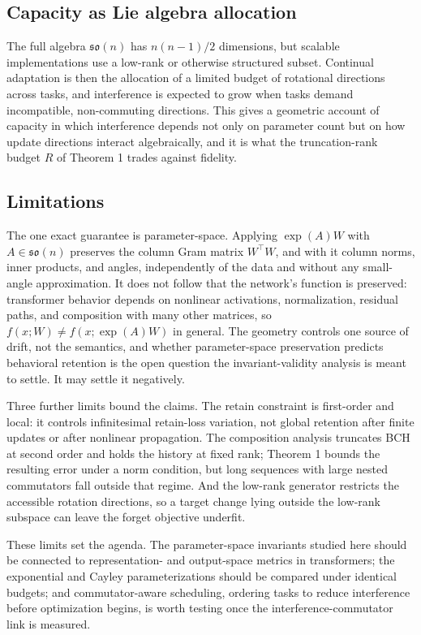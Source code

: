 \documentclass[
]{article}
\begin{document}
\subsection{Capacity as Lie algebra allocation}\label{capacity-as-lie-algebra-allocation}

The full algebra \(\mathfrak{so}(n)\) has \(n(n-1)/2\) dimensions, but scalable implementations use a low-rank or otherwise structured subset. Continual adaptation is then the allocation of a limited budget of rotational directions across tasks, and interference is expected to grow when tasks demand incompatible, non-commuting directions. This gives a geometric account of capacity in which interference depends not only on parameter count but on how update directions interact algebraically, and it is what the truncation-rank budget \(R\) of Theorem 1 trades against fidelity.

\subsection{Limitations}\label{limitations}

The one exact guarantee is parameter-space. Applying \(\exp(A)W\) with \(A\in\mathfrak{so}(n)\) preserves the column Gram matrix \(W^\top W\), and with it column norms, inner products, and angles, independently of the data and without any small-angle approximation. It does not follow that the network's function is preserved: transformer behavior depends on nonlinear activations, normalization, residual paths, and composition with many other matrices, so \(f(x;W)\neq f(x;\exp(A)W)\) in general. The geometry controls one source of drift, not the semantics, and whether parameter-space preservation predicts behavioral retention is the open question the invariant-validity analysis is meant to settle. It may settle it negatively.

Three further limits bound the claims. The retain constraint is first-order and local: it controls infinitesimal retain-loss variation, not global retention after finite updates or after nonlinear propagation. The composition analysis truncates BCH at second order and holds the history at fixed rank; Theorem 1 bounds the resulting error under a norm condition, but long sequences with large nested commutators fall outside that regime. And the low-rank generator restricts the accessible rotation directions, so a target change lying outside the low-rank subspace can leave the forget objective underfit.

These limits set the agenda. The parameter-space invariants studied here should be connected to representation- and output-space metrics in transformers; the exponential and Cayley parameterizations should be compared under identical budgets; and commutator-aware scheduling, ordering tasks to reduce interference before optimization begins, is worth testing once the interference-commutator link is measured.
\end{document}
